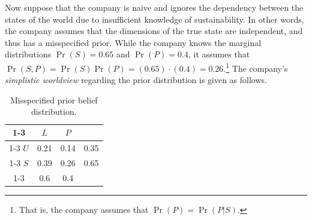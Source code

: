 \documentclass[12pt,english]{article}
\theoremstyle{plain}
\begin{document}

Now suppose that the company is naive and ignores the dependency between the states of the world due to insufficient knowledge of sustainability. 
In other words, the company assumes that the dimensions of the true state are independent, and thus has a misspecified prior. 
While the company knows the marginal distributions $\Pr(S)=0.65$ and $\Pr(P)=0.4$, it assumes that $\Pr(S,P)=\Pr(S)\Pr(P)=(0.65)\cdot (0.4)=0.26$.\footnote{That is, the company assumes that $\Pr(P)=\Pr(P\vert S)$.} 
The company's \emph{simplistic worldview} regarding the prior distribution is given as follows. 
\begin{table}[H]
\begin{centering}
\begin{tabular}{|c|c|c|c}
\cline{1-3} \cline{2-3} \cline{3-3} 
 & $L$ & $P$ & \tabularnewline
\cline{1-3} \cline{2-3} \cline{3-3} 
$U$ & 0.21 & 0.14 & 0.35\tabularnewline
\cline{1-3} \cline{2-3} \cline{3-3} 
$S$ & 0.39 & 0.26 & 0.65 \tabularnewline
\cline{1-3} \cline{2-3} \cline{3-3} 
\multicolumn{1}{c}{} & \multicolumn{1}{c}{0.6} & \multicolumn{1}{c}{0.4} & \tabularnewline
\end{tabular}
\par\end{centering}
\caption{Misspecified prior belief distribution.}
\label{tab:ex2}
\end{table}
\end{document}
